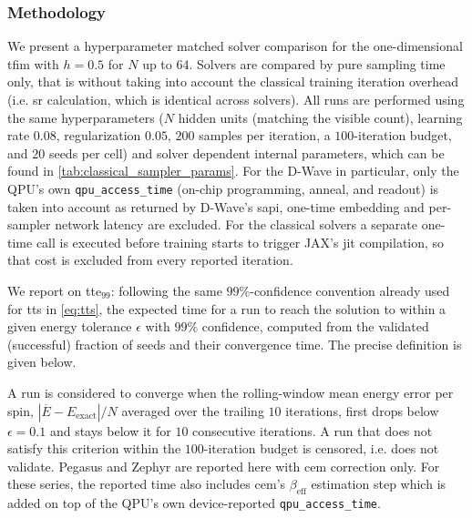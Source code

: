 \documentclass[10pt,a4paper]{article}
\numberwithin{equation}{section}
\begin{document}
\subsubsection{Methodology}
We present a hyperparameter matched solver comparison for the one-dimensional \gls{tfim} with $h=0.5$ for $N$ up to 64. Solvers are compared by pure sampling time only, that is without taking into account the classical training iteration overhead (i.e. \gls{sr} calculation, which is identical across solvers). All runs are performed using the same hyperparameters ($N$ hidden units (matching the visible count), learning rate $0.08$, regularization $0.05$, $200$ samples per iteration, a $100$-iteration budget, and $20$ seeds per cell) and solver dependent internal parameters, which can be found in \autoref{tab:classical_sampler_params}. For the D-Wave in particular, only the QPU's own \texttt{qpu\_access\_time} (on-chip programming, anneal, and readout) is taken into account as returned by D-Wave's \gls{sapi}, one-time embedding and per-sampler network latency are excluded. For the classical solvers a separate one-time call is executed before training starts to trigger JAX's \gls{jit} compilation, so that cost is excluded from every reported iteration. 

We report on \gls{tte}$_{99}$: following the same $99\%$-confidence convention already used for \gls{tts} in \autoref{eq:tts}, the expected time for a run to reach the solution to within a given energy tolerance $\epsilon$ with $99\%$ confidence, computed from the validated (successful) fraction of seeds and their convergence time. The precise definition is given below.

A run is considered to converge when the rolling-window mean energy error per spin, $|\overline{E}-E_\mathrm{exact}|/N$ averaged over the trailing $10$ iterations, first drops below $\epsilon=0.1$ and stays below it for $10$ consecutive iterations. A run that does not satisfy this criterion within the $100$-iteration budget is censored, i.e. does not validate. Pegasus and Zephyr are reported here with \gls{cem} correction only. For these series, the reported time also includes \gls{cem}'s $\beta_\text{eff}$ estimation step which is added on top of the QPU's own device-reported \texttt{qpu\_access\_time}. 
\end{document}
